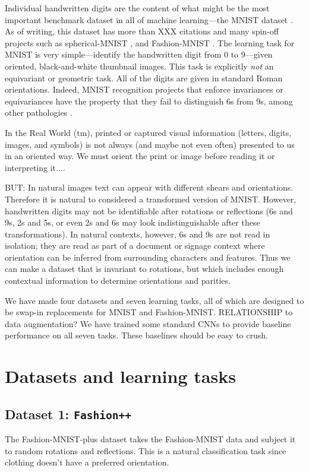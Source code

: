 \documentclass{article}
\begin{document}
Individual handwritten digits are the content of what might be the most important benchmark dataset in all of machine learning---the MNIST dataset \cite{mnist}.
As of writing, this dataset has more than XXX citations and many spin-off projects such as spherical-MNIST \cite{spherical}, and Fashion-MNIST \cite{fashion}.
The learning task for MNIST is very simple---identify the handwritten digit from 0 to 9---given oriented, black-and-white thumbnail images.
This task is explicitly \emph{not} an equivariant or geometric task.
All of the digits are given in standard Roman orientations.
Indeed, MNIST recognition projects that enforce invariances or equivariances have the property that they fail to distinguish 6s from 9s, among other pathologies \cite{something}.

In the Real World (tm), printed or captured visual information (letters, digits, images, and symbols) is not always (and maybe not even often) presented to us in an oriented way.
We must orient the print or image before reading it or interpreting it....

BUT: In natural images text can appear with different shears and orientations.
Therefore it is natural to considered a transformed version of MNIST. However, handwritten digits may not be identifiable after rotations or reflections (6s and 9s, 2s and 5s, or even 2s and 6s may look indistinguishable after these transformations).
In natural contexts, however, 6s and 9s are not read in isolation; they are read as part of a document or signage context where orientation can be inferred from surrounding characters and features.
Thus we can make a dataset that is invariant to rotations, but which includes enough contextual information to determine orientations and parities.

We have made four datasets and seven learning tasks, all of which are designed to be swap-in replacements for MNIST and Fashion-MNIST.
RELATIONSHIP to data augmentation?
We have trained some standard CNNs to provide baseline performance on all seven tasks.
These baselines should be easy to crush.

\section{Datasets and learning tasks}

\subsection*{Dataset 1: \texttt{Fashion++}}
The Fashion-MNIST-plus dataset takes the Fashion-MNIST data and subject it to random rotations and reflections. This is a natural classification task since clothing doesn't have a preferred orientation.
\end{document}
